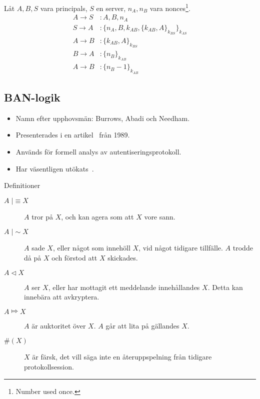 \documentclass{beamer}
\theoremstyle{definition}
\theoremstyle{remark}
\DeclareMathOperator{\believes}{|\!\!\!\equiv}
\DeclareMathOperator{\said}{|\!\!\!\sim}
\DeclareMathOperator{\controls}{\Mapsto}
\DeclareMathOperator{\sees}{\lhd}
\newcommand{\fresh}[1]{\#(#1)}
\newcommand{\encrypt}[2]{\{#1\}_{#2}}
\begin{document}
\begin{frame}
  \begin{example}
    Låt \(A, B, S\) vara principals, \(S\) en server, \(n_A, n_B\) vara 
    nonces\footnote{Number used once.}.
    \begin{align*}
      A\to S &\colon A, B, n_A \\
      S\to A &\colon \encrypt{n_A, B, k_{AB}, \encrypt{k_{AB}, 
      A}{k_{BS}}}{k_{AS}} \\
      A\to B &\colon \encrypt{k_{AB}, A}{k_{BS}} \\
      B\to A &\colon \encrypt{n_B}{k_{AB}} \\
      A\to B &\colon \encrypt{n_B-1}{k_{AB}}
    \end{align*}
  \end{example}
\end{frame}

\subsection{BAN-logik}

\begin{frame}
  \begin{itemize}
    \item Namn efter upphovsmän: Burrows, Abadi och Needham.
    \item Presenterades i en artikel~\cite{BAN90alo} från 1989.
    \item Används för formell analys av autentiseringsprotokoll.
    \item Har väsentligen utökats~\cite{Syverson2001tlo}.
  \end{itemize}
\end{frame}

\begin{frame}{Definitioner}
  \begin{description}
    \item[\(A\believes X\)] \(A\) tror på \(X\), och kan agera som att \(X\) 
      vore sann.
    \item[\(A\said X\)] \(A\) sade \(X\), eller något som innehöll \(X\), vid 
      något tidigare tillfälle.
      \(A\) trodde då på \(X\) och förstod att \(X\) skickades.
    \item[\(A\sees X\)] \(A\) ser \(X\), eller har mottagit ett meddelande 
      innehållandes \(X\).
      Detta kan innebära att avkryptera.
    \item[\(A\controls X\)] \(A\) är auktoritet över \(X\).
      \(A\) går att lita på gällandes \(X\).
    \item[\(\fresh X\)] \(X\) är färsk, det vill säga inte en återuppspelning 
      från tidigare protokollsession.
  \end{description}
\end{frame}
\end{document}
